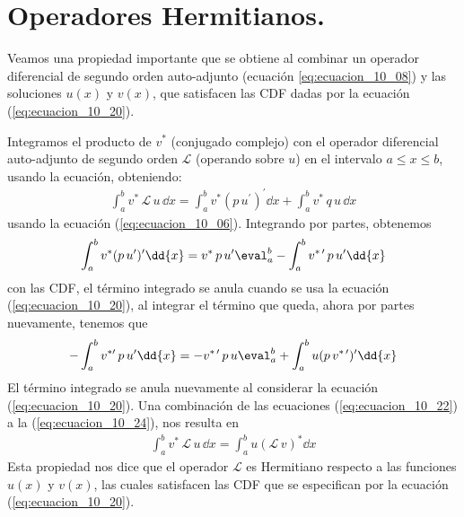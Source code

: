 \section{Operadores Hermitianos.}
Veamos una propiedad importante que se obtiene al combinar un operador diferencial de segundo orden auto-adjunto (ecuación \ref{eq:ecuacion_10_08}) y las soluciones $u(x)$ y $v(x)$, que satisfacen las CDF dadas por la ecuación (\ref{eq:ecuacion_10_20}).
\par
Integramos el producto de $v^{*}$ (conjugado complejo) con el operador diferencial auto-adjunto de segundo orden $\mathcal{L}$ (operando sobre $u$) en el intervalo $a \leq x \leq b$, usando la ecuación, obteniendo:
\begin{align}
\int_{a}^{b} v^{*} \, \mathcal{L} \, u \, \dd{x} = \int_{a}^{b} v^{*} (p \, u^{\prime})^{\prime} \dd{x} + \int_{a}^{b} v^{*} \, q \, u \, \dd{x}
\label{eq:ecuacion_10_22}
\end{align}
usando la ecuación (\ref{eq:ecuacion_10_06}). Integrando por partes, obtenemos
\begin{align}
\int_{a}^{b} v^{*}(p \, u^{\prime})^{\prime} \dd{x} = v^{*} \, p \, u^{\prime} \eval_{a}^{b} - \int_{a}^{b} v^{* \, \prime} \, p \, u^{\prime} \dd{x}
\label{eq:ecuacion_10_23}
\end{align}
con las CDF, el término integrado se anula cuando se usa la ecuación (\ref{eq:ecuacion_10_20}), al integrar el término que queda, ahora por partes nuevamente, tenemos que
\begin{align}
- \int_{a}^{b} v^{* \prime} \, p \, u^{\prime} \dd{x} = - v^{* \, \prime} \, p \, u \eval_{a}^{b} + \int_{a}^{b} u(p \, v^{* \, \prime})^{\prime} \dd{x}
\label{eq:ecuacion_10_24}
\end{align}
El término integrado se anula nuevamente al considerar la ecuación (\ref{eq:ecuacion_10_20}). Una combinación de las ecuaciones (\ref{eq:ecuacion_10_22}) a la (\ref{eq:ecuacion_10_24}), nos resulta en
\begin{align}
\int_{a}^{b} v^{*} \, \mathcal{L} \, u \, \dd{x} = \int_{a}^{b} u (\mathcal{L}  \, v)^{*} \dd{x}
\label{eq:ecuacion_10_25}
\end{align}
Esta propiedad nos dice que el operador $\mathcal{L}$ es Hermitiano respecto a las funciones $u(x)$ y $v(x)$, las cuales satisfacen las CDF que se especifican por la ecuación (\ref{eq:ecuacion_10_20}).
